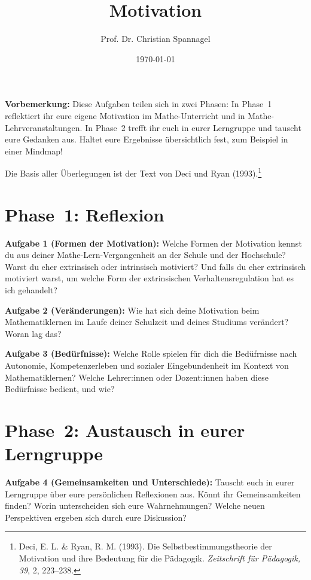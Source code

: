\documentclass{../cssheet}
\title{Motivation}
\author{Prof. Dr. Christian Spannagel}
\date{\today}
\begin{document}
\printtitle

\textbf{Vorbemerkung:}  Diese Aufgaben teilen sich in zwei Phasen: In Phase~1 reflektiert ihr eure eigene Motivation im Mathe-Unterricht und in Mathe-Lehrveranstaltungen. In Phase~2 trefft ihr euch in eurer Lerngruppe und tauscht eure Gedanken aus. Haltet eure Ergebnisse übersichtlich fest, zum Beispiel in einer Mindmap!

Die Basis aller Überlegungen ist der Text von Deci und Ryan (1993).\footnote{Deci, E. L. \& Ryan, R. M. (1993). Die Selbstbestimmungstheorie der Motivation und ihre Bedeutung für die Pädagogik. \emph{Zeitschrift für Pädagogik, 39}, 2, 223--238.}

\section*{Phase~1: Reflexion}

\textbf{Aufgabe 1 (Formen der Motivation):}  Welche Formen der Motivation kennst du aus deiner \glqq{}Mathe-Lern-Vergangenheit\grqq{} an der Schule und der Hochschule? Warst du eher extrinsisch oder intrinsisch motiviert? Und falls du eher extrinsisch motiviert warst, um welche Form der extrinsischen Verhaltensregulation hat es ich gehandelt?

\textbf{Aufgabe 2 (Veränderungen):} Wie hat sich deine Motivation beim Mathematiklernen im Laufe deiner Schulzeit und deines Studiums verändert? Woran lag das?

\textbf{Aufgabe 3 (Bedürfnisse):}  Welche Rolle spielen für dich die Bedüfrnisse nach Autonomie, Kompetenzerleben und sozialer Eingebundenheit im Kontext von Mathematiklernen? Welche Lehrer:innen oder Dozent:innen haben diese Bedürfnisse bedient, und wie?



\section*{Phase~2: Austausch in eurer Lerngruppe}

\textbf{Aufgabe 4 (Gemeinsamkeiten und Unterschiede):} Tauscht euch in eurer Lerngruppe über eure persönlichen Reflexionen aus. Könnt ihr Gemeinsamkeiten finden? Worin unterscheiden sich eure Wahrnehmungen? Welche neuen Perspektiven ergeben sich durch eure Diskussion?


\vspace*{10mm}
\printlicense

\printsocials
\end{document}
